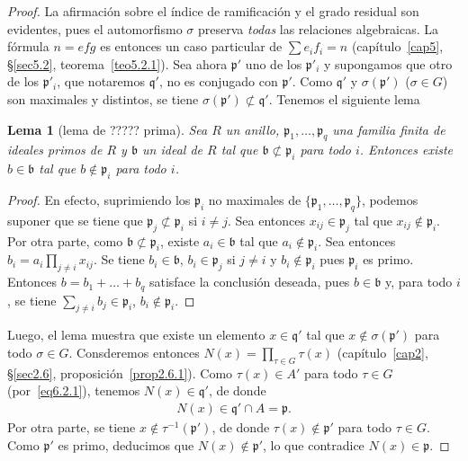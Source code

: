 \documentclass[oneside,bibtotoc,leqno,spanish]{amsbook}
\newcommand{\idl}[1]{\mathfrak{#1}}
\newcommand{\QED}{}%
\numberwithin{equation}{section}
\theoremstyle{defi}
\theoremstyle{note}
\newtheorem{lemma}{Lema}
\theoremstyle{rem}
\numberwithin{theorem}{section}
\numberwithin{proposition}{section}
\numberwithin{definition}{section}
\numberwithin{lemma}{section}
\numberwithin{corollary}{section}
\numberwithin{example}{section}
\numberwithin{footnote}{section}%
\begin{document}
\begin{proof}
La afirmaci\'on sobre el \'indice de ramificaci\'on y el grado residual son evidentes, pues el automorfismo
$\sigma$ preserva {\em todas} las relaciones algebraicas. La f\'ormula $n=efg$ es entonces un caso particular
de $\sum e_{i}f_{i}=n$ (cap\'itulo~\ref{cap5}, \S\ref{sec5.2}, teorema~\ref{teo5.2.1}). Sea ahora $\idl{p}'$ uno de los $\idl{p}'_{i}$
y supongamos que otro de los $\idl{p}'_{i}$, que notaremos $\idl{q}'$, no es conjugado con $\idl{p}'$.
Como $\idl{q}'$ y $\sigma(\idl{p}')$ ($\sigma\in G$) son maximales y distintos, se tiene $\sigma(\idl{p}')\not\subset\idl{q}'$.
Tenemos el siguiente lema

\begin{lemma}[lema de ????? prima]
Sea $R$ un anillo, $\idl{p}_{1},\dots,\idl{p}_{q}$ una familia finita de ideales primos de $R$ y $\idl{b}$
un ideal de $R$ tal que $\idl{b}\not\subset\idl{p}_{i}$ para todo $i$. Entonces existe $b\in\idl{b}$ tal que
$b\notin\idl{p}_{i}$ para todo $i$.
\end{lemma}

\begin{proof}
En efecto, suprimiendo los $\idl{p}_{i}$ no maximales de
$\{\idl{p}_{1},\dots,\idl{p}_{q}\}$, podemos suponer
que se tiene que $\idl{p}_{j}\not\subset\idl{p}_{i}$ si $i\neq j$. Sea entonces
$x_{ij}\in\idl{p}_{j}$ tal que
$x_{ij}\notin\idl{p}_{i}$. Por otra parte, como $\idl{b}\not\subset\idl{p}_{i}$, existe
$a_{i}\in\idl{b}$
tal que $a_{i}\notin\idl{p}_{i}$. Sea entonces $b_{i} = a_{i}\prod_{j\neq i}x_{ij}$. Se tiene
$b_{i}\in\idl{b}$, $b_{i}\in\idl{p}_{j}$ si $j\neq i$ y $b_{i}\notin\idl{p}_{i}$ pues
$\idl{p}_{i}$ es primo.
Entonces $b=b_{1}+\dots+b_{q}$ satisface la conclusi\'on deseada, pues $b\in\idl{b}$ y,
para todo $i$, se tiene
$\sum_{j\neq i}b_{j}\in\idl{p}_{i}$, $b_{i}\notin\idl{p}_{i}$. \QED
\end{proof}

Luego, el lema muestra que existe un elemento $x\in\idl{q}'$ tal que $x\notin\sigma(\idl{p}')$ para todo
$\sigma\in G$. Consderemos entonces $N(x) = \prod_{\tau\in G}\tau(x)$ (cap\'itulo~\ref{cap2}, \S\ref{sec2.6},
proposici\'on~\ref{prop2.6.1}).
Como $\tau(x)\in A'$ para todo $\tau\in G$ (por~\eqref{eq6.2.1}),
tenemos $N(x)\in\idl{q}'$, de donde
\begin{gather*}
N(x) \in \idl{q}'\cap A = \idl{p}.
\end{gather*}
Por otra parte, se tiene $x\notin\tau^{-1}(\idl{p}')$, de donde $\tau(x)\notin\idl{p}'$
para todo
$\tau\in G$. Como $\idl{p}'$ es primo, deducimos que $N(x)\notin\idl{p}'$, lo que
contradice $N(x)\in\idl{p}$. \QED
\end{proof}
\end{document}
